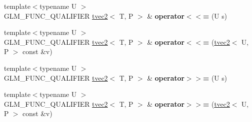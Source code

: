 \begin{DoxyCompactItemize}
\item 
{\footnotesize template$<$typename U $>$ }\\G\+L\+M\+\_\+\+F\+U\+N\+C\+\_\+\+Q\+U\+A\+L\+I\+F\+I\+ER \hyperlink{structglm_1_1detail_1_1tvec2}{tvec2}$<$ T, P $>$ \& {\bfseries operator$<$$<$=} (U s)\hypertarget{structglm_1_1detail_1_1tvec2_a5e89548db90fffa27f6076b2a94f83d7}{}\label{structglm_1_1detail_1_1tvec2_a5e89548db90fffa27f6076b2a94f83d7}

\item 
{\footnotesize template$<$typename U $>$ }\\G\+L\+M\+\_\+\+F\+U\+N\+C\+\_\+\+Q\+U\+A\+L\+I\+F\+I\+ER \hyperlink{structglm_1_1detail_1_1tvec2}{tvec2}$<$ T, P $>$ \& {\bfseries operator$<$$<$=} (\hyperlink{structglm_1_1detail_1_1tvec2}{tvec2}$<$ U, P $>$ const \&v)\hypertarget{structglm_1_1detail_1_1tvec2_a501a88775ae24755acb58b2572cc3ec9}{}\label{structglm_1_1detail_1_1tvec2_a501a88775ae24755acb58b2572cc3ec9}

\item 
{\footnotesize template$<$typename U $>$ }\\G\+L\+M\+\_\+\+F\+U\+N\+C\+\_\+\+Q\+U\+A\+L\+I\+F\+I\+ER \hyperlink{structglm_1_1detail_1_1tvec2}{tvec2}$<$ T, P $>$ \& {\bfseries operator$>$$>$=} (U s)\hypertarget{structglm_1_1detail_1_1tvec2_a7827364730dbfab98293a22f1c3a73d1}{}\label{structglm_1_1detail_1_1tvec2_a7827364730dbfab98293a22f1c3a73d1}

\item 
{\footnotesize template$<$typename U $>$ }\\G\+L\+M\+\_\+\+F\+U\+N\+C\+\_\+\+Q\+U\+A\+L\+I\+F\+I\+ER \hyperlink{structglm_1_1detail_1_1tvec2}{tvec2}$<$ T, P $>$ \& {\bfseries operator$>$$>$=} (\hyperlink{structglm_1_1detail_1_1tvec2}{tvec2}$<$ U, P $>$ const \&v)\hypertarget{structglm_1_1detail_1_1tvec2_afbc6fa3075b872f1a10c5ad97e08b012}{}\label{structglm_1_1detail_1_1tvec2_afbc6fa3075b872f1a10c5ad97e08b012}

\end{DoxyCompactItemize}
